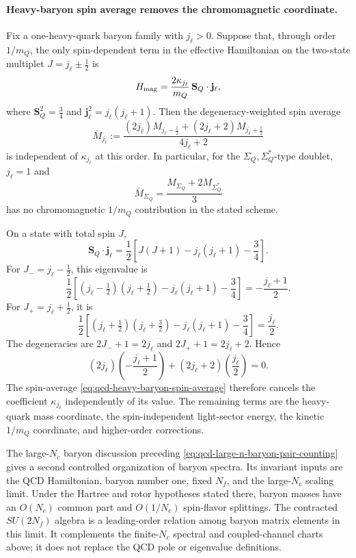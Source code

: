 \paragraph{Heavy-baryon spin average removes the chromomagnetic coordinate.}
Fix a one-heavy-quark baryon family with \(j_\ell>0\).  Suppose that, through
order \(1/m_Q\), the only spin-dependent term in the effective Hamiltonian
on the two-state multiplet \(J=j_\ell\pm\frac12\) is
\begin{equation}
  H_{\rm mag}
  =
  \frac{2\kappa_{j_\ell}}{m_Q}\,
  \mathbf S_Q\cdot\mathbf j_\ell ,
  \label{eq:qcd-heavy-baryon-chromomagnetic-hamiltonian}
\end{equation}
where \(\mathbf S_Q^2=\frac34\) and
\(\mathbf j_\ell^2=j_\ell(j_\ell+1)\).  Then the degeneracy-weighted
spin average
\begin{equation}
  \overline M_{j_\ell}
  :=
  \frac{(2j_\ell)M_{j_\ell-\frac12}
        +(2j_\ell+2)M_{j_\ell+\frac12}}
       {4j_\ell+2}
  \label{eq:qcd-heavy-baryon-spin-average}
\end{equation}
is independent of \(\kappa_{j_\ell}\) at this order.  In particular,
for the \(\Sigma_Q,\Sigma_Q^\ast\)-type doublet, \(j_\ell=1\) and
\begin{equation}
  \overline M_{\Sigma_Q}
  =
  \frac{M_{\Sigma_Q}+2M_{\Sigma_Q^\ast}}{3}
  \label{eq:qcd-sigma-heavy-spin-average}
\end{equation}
has no chromomagnetic \(1/m_Q\) contribution in the stated scheme.

On a state with total spin \(J\),
\[
  \mathbf S_Q\cdot\mathbf j_\ell
  =
  \frac12\left[J(J+1)-j_\ell(j_\ell+1)-\frac34\right].
\]
For \(J_-=j_\ell-\frac12\), this eigenvalue is
\[
  \frac12\left[(j_\ell-\tfrac12)(j_\ell+\tfrac12)
  -j_\ell(j_\ell+1)-\frac34\right]
  =
  -\frac{j_\ell+1}{2}.
\]
For \(J_+=j_\ell+\frac12\), it is
\[
  \frac12\left[(j_\ell+\tfrac12)(j_\ell+\tfrac32)
  -j_\ell(j_\ell+1)-\frac34\right]
  =
  \frac{j_\ell}{2}.
\]
The degeneracies are \(2J_-+1=2j_\ell\) and \(2J_++1=2j_\ell+2\).  Hence
\[
  (2j_\ell)\left(-\frac{j_\ell+1}{2}\right)
  +(2j_\ell+2)\left(\frac{j_\ell}{2}\right)=0 .
\]
The spin-average \eqref{eq:qcd-heavy-baryon-spin-average} therefore cancels
the coefficient \(\kappa_{j_\ell}\) independently of its value.  The remaining
terms are the heavy-quark mass coordinate, the spin-independent light-sector
energy, the kinetic \(1/m_Q\) coordinate, and higher-order corrections.

\begin{remark}
The large-\(N_c\) baryon discussion preceding
\eqref{eq:qcd-large-n-baryon-pair-counting} gives a second controlled
organization of baryon spectra.  Its invariant inputs are the QCD
Hamiltonian, baryon number one, fixed \(N_f\), and the large-\(N_c\) scaling
limit.  Under the Hartree and rotor hypotheses stated there, baryon masses
have an \(O(N_c)\) common part and \(O(1/N_c)\) spin-flavor splittings.  The
contracted \(SU(2N_f)\) algebra is a leading-order relation among baryon
matrix elements in this limit.  It complements the finite-\(N_c\) spectral
and coupled-channel charts above; it does not replace the QCD pole or
eigenvalue definitions.
\end{remark}

